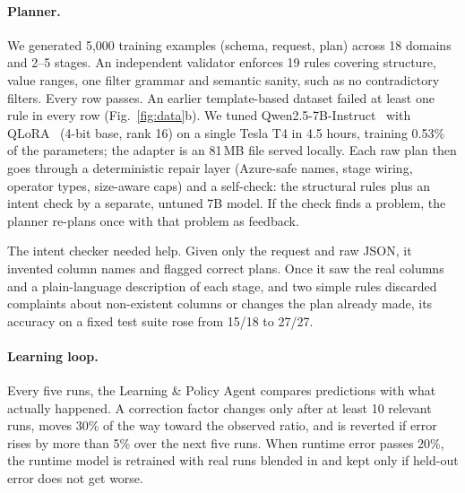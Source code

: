 \documentclass[runningheads]{llncs}
\begin{document}
\paragraph{Planner.} We generated 5{,}000 training examples (schema, request, plan) across 18
domains and 2--5 stages. An independent validator enforces 19 rules covering structure, value
ranges, one filter grammar and semantic sanity, such as no contradictory filters. Every row
passes. An earlier template-based dataset failed at least one rule in every row
(Fig.~\ref{fig:data}b). We tuned Qwen2.5-7B-Instruct~\cite{qwen25} with QLoRA~\cite{qlora}
(4-bit base, rank 16) on a single Tesla T4 in 4.5 hours, training 0.53\% of the parameters; the
adapter is an 81\,MB file served locally. Each raw plan then goes through a deterministic repair
layer (Azure-safe names, stage wiring, operator types, size-aware caps) and a self-check: the
structural rules plus an intent check by a separate, untuned 7B model. If the check finds a
problem, the planner re-plans once with that problem as feedback.

The intent checker needed help. Given only the request and raw JSON, it invented column names
and flagged correct plans. Once it saw the real columns and a plain-language description of each
stage, and two simple rules discarded complaints about non-existent columns or changes the plan
already made, its accuracy on a fixed test suite rose from 15/18 to 27/27.

\paragraph{Learning loop.} Every five runs, the Learning \& Policy Agent compares predictions with
what actually happened. A correction factor changes only after at least 10 relevant runs, moves
30\% of the way toward the observed ratio, and is reverted if error rises by more than 5\% over the
next five runs. When runtime error passes 20\%, the runtime model is retrained with real runs
blended in and kept only if held-out error does not get worse.
\end{document}
